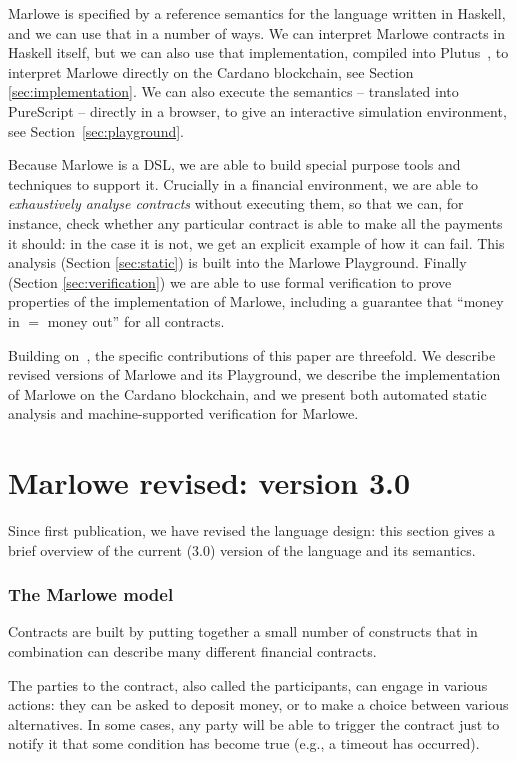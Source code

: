 \documentclass[runningheads]{llncs}
\begin{document}
Marlowe is specified by a reference semantics for the language written in Haskell, and we can use that in a number of ways. We can interpret Marlowe contracts in Haskell itself, but we can also use that implementation, compiled into Plutus~\cite{PlutusPlatform}, to interpret Marlowe directly on the Cardano blockchain, see Section \ref{sec:implementation}. We can also execute the semantics -- translated into PureScript -- directly in a browser, to give an interactive simulation environment, see Section~\ref{sec:playground}.

Because Marlowe is a DSL, we are able to build special purpose tools and techniques to support it. Crucially in a financial environment, we are able to \emph{exhaustively analyse contracts} without executing them, so that we can, for instance, check whether any particular contract is able to make all the payments it should: in the case it is not, we get an explicit example of how it can fail. This analysis (Section \ref{sec:static}) is built into the Marlowe Playground. Finally (Section \ref{sec:verification}) we are able to use formal verification to prove properties of the implementation of Marlowe, including a guarantee that ``money in $=$ money out'' for all contracts.

Building on~\cite{isola-marlowe}, the specific contributions of this paper are threefold. We describe revised versions of Marlowe and its Playground, we describe the implementation of Marlowe on the Cardano blockchain, and we present both automated static analysis and machine-supported verification for Marlowe.

\section{Marlowe revised: version 3.0}
\label{sec:overview}

Since first publication, we have revised the language design: this section gives a brief overview of the current (3.0) version of the language and its semantics.


\subsubsection*{The Marlowe model}

Contracts are built by putting together a small number of constructs that in combination can  describe many different financial contracts.

The parties to the contract, also called the participants, can engage in various actions: they can be asked to deposit money, or to make a choice between various alternatives. In some cases, any party will be able to trigger the contract just to notify it that some condition has become true (e.g., a timeout has occurred).
\end{document}
